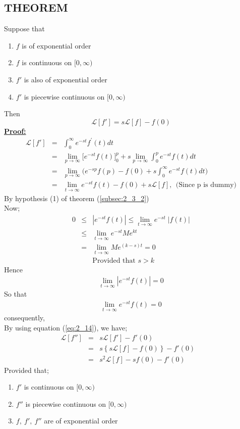 \documentclass[11pt]{report}
\newcommand{\Laplace}{\mathcal{L}}
\newcommand{\ft}{f(t)}
\newcommand{\ftp}[1]{f^{#1}(t)}
\newcommand{\sbracket}[1]{\left[#1\right]}
\newcommand{\LFn}[1]{\Laplace \sbracket{#1}}
\newcommand{\ubt}[1]{\textbf{\underline{#1}}}
\newcommand{\sps}{\\[0.2cm]}
\newcommand{\refn}[1]{(\ref{#1})}
\newcommand{\refx}[1]{\refn{eq:#1}}
\newcommand{\sprime}{'}
\newcommand{\dprime}{''}
\newcommand{\inte}{\int_0^\infty e^{-st}}
\begin{document}
	\subsection{THEOREM}
	Suppose that
	\begin{enumerate}
		\renewcommand{\labelenumi}{(\roman{enumi})}
		\item $f$ is of exponential order
		\item $f$ is continuous on $[0, \infty)$
		\item $f\sprime$ is also of exponential order
		\item $f\sprime$ is piecewise continuous on $[0, \infty)$
	\end{enumerate}
	Then
	\begin{equation}
		\LFn{f\sprime} = s\LFn{f} - f(0)
		\label{eq:2_14}
	\end{equation}	
	\ubt{Proof:}
	\begin{eqnarray*}
		\LFn{f\sprime} &=&\inte \ftp{\sprime}dt\sps
		&=& \lim\limits_{p\rightarrow\infty}\Big[ e^{-st}\ft  \Big]_0^p + s\lim\limits_{p\rightarrow\infty}\int_0^p e^{-st}\ft dt\sps
		&=&\lim\limits_{p\rightarrow\infty}\Big( e^{-sp} f(p) - f(0) + s\inte\ft dt \Big)\sps
		&=& \lim\limits_{t\rightarrow\infty} e^{-st}\ft - f(0)+ s\LFn{f}, ~~\text{(Since p is dummy)}
	\end{eqnarray*}
	By hypothesis (1) of theorem (\ref{subsec:2_3_2})\\
	Now;
	\begin{eqnarray*}
		0 &\leq& \left|e^{-st}\ft\right| \leq \lim\limits_{t\rightarrow\infty} e^{-st}\;\big|\ft\big|\sps
		&\leq& \lim\limits_{t\rightarrow\infty} e^{-st}Me^{kt}\sps
		&=& \lim\limits_{t\rightarrow\infty}Me^{(k-s)t} = 0\sps
		&&\text{Provided that } s > k
	\end{eqnarray*}
	Hence
	\begin{eqnarray*}
		\lim\limits_{t\rightarrow\infty}\left| e^{-st} \ft \right| = 0
	\end{eqnarray*}
	So that
	\begin{eqnarray*}
		\lim\limits_{t\rightarrow\infty} e^{-st}\ft = 0
	\end{eqnarray*}
	consequently,\\
	By using equation \refx{2_14}, we have;
	\begin{eqnarray*}
		\LFn{f\dprime} &=& s\LFn{f\sprime} - f\sprime(0)\sps
		&=& s\left\{s\LFn{f} - f(0)\right\}-f\sprime(0) ~~~~ \sps
		&=& s^2\LFn{f}-sf(0) - f\sprime(0)
	\end{eqnarray*}
	Provided that;
	\begin{enumerate}
		\item $f\sprime$ is continuous on $[0, \infty)$
		\item $f\dprime$ is piecewise continuous on $[0, \infty)$
		\item $f,~f\sprime,~f\dprime$ are of exponential order
	\end{enumerate}
\end{document}
